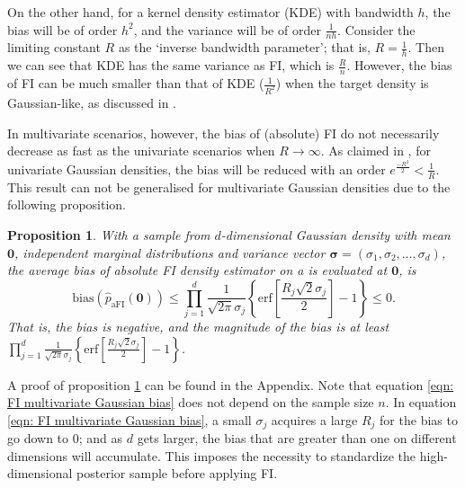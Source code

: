 \documentclass[%
 reprint,
 amsmath,amssymb,
 aps,
]{revtex4-2}
\newtheorem{proposition}[theorem]{Proposition}
\def\erf{\text{erf}}
\begin{document}
On the other hand, for a kernel density estimator (KDE) with bandwidth $h$, the bias will be of order $h^2$, and the variance will be of order $\frac{1}{nh}$. Consider the limiting constant $R$ as the `inverse bandwidth parameter'; that is, $R = \frac{1}{h}$. Then we can see that KDE has the same variance as FI, which is $\frac{R}{n}$. However, the bias of FI can be much smaller than that of KDE ($\frac{1}{R^2}$) when the target density is Gaussian-like, as discussed in \cite{rotiroti2022computing}.
  
In multivariate scenarios, however, the bias of (absolute) FI do not necessarily decrease as fast as the univariate scenarios when $R \to \infty$. As claimed in \cite{rotiroti2022computing}, for univariate Gaussian densities, the bias will be reduced with an order $e^{\frac{-R^2}{2}} < \frac{1}{R}$. This result can not be generalised for multivariate Gaussian densities due to the following proposition.

\begin{proposition} \label{prop: FI Gaussian bias}
    With a sample from $d$-dimensional Gaussian density with mean $\mathbf{0}$, independent marginal distributions and variance vector $\boldsymbol{\sigma} = (\sigma_1, \sigma_2, \ldots, \sigma_d)$, the average bias of absolute FI density estimator on a is evaluated at $\mathbf{0}$, is 
    \begin{equation} \label{eqn: FI multivariate Gaussian bias}
        \text{bias}(\hat{p}_\text{aFI}(\mathbf{0})) \le \prod_{j=1}^d \frac{1}{\sqrt{2\pi}\sigma_j}\left\{\erf\left[\frac{R_j \sqrt{2}\sigma_j}{2} \right]-1 \right\} \le 0.
    \end{equation}
    That is, the bias is negative, and the magnitude of the bias is at least $\displaystyle \prod_{j=1}^d \frac{1}{\sqrt{2\pi}\sigma_j}\left\{\erf\left[\frac{R_j \sqrt{2}\sigma_j}{2} \right]-1 \right\}$.
\end{proposition}
A proof of proposition \ref{prop: FI Gaussian bias} can be found in the Appendix. Note that equation \eqref{eqn: FI multivariate Gaussian bias} does not depend on the sample size $n$. In equation \eqref{eqn: FI multivariate Gaussian bias}, a small $\sigma_j$ acquires a large $R_j$ for the bias to go down to 0; and as $d$ gets larger, the bias that are greater than one on different dimensions will accumulate. This imposes the necessity to standardize the high-dimensional posterior sample before applying FI.
 
\end{document}
